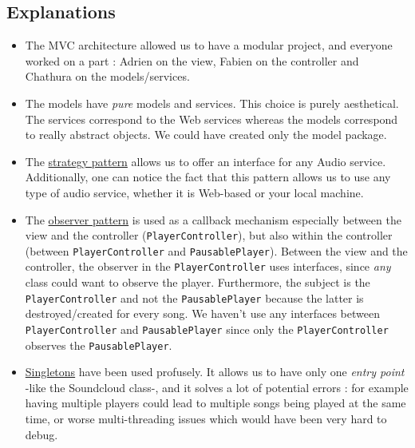 \documentclass{report}
\begin{document}
{\subsection{Explanations}

\begin{itemize}
\item The MVC architecture allowed us to have a modular project, and everyone worked on a part : Adrien on the view, Fabien on the controller and Chathura on the models/services. 
\item The models have \textit{pure} models and services. This choice is purely aesthetical. The services correspond to the Web services whereas the models correspond to really abstract objects. We could have created only the model package.
\item The \href{https://en.wikipedia.org/wiki/Strategy_pattern}{strategy pattern} allows us to offer an interface for any Audio service. Additionally, one can notice the fact that this pattern allows us to use any type of audio service, whether it is Web-based or your local machine.
\item The \href{https://en.wikipedia.org/wiki/Observer_pattern}{observer pattern} is used as a callback mechanism especially between the view and the controller (\texttt{PlayerController}), but also within the controller (between \texttt{PlayerController} and \texttt{PausablePlayer}). Between the view and the controller, the observer in the \texttt{PlayerController} uses interfaces, since \textit{any} class could want to observe the player. Furthermore, the subject is the \texttt{PlayerController} and not the \texttt{PausablePlayer} because the latter is destroyed/created for every song. We haven't use any interfaces between \texttt{PlayerController} and \texttt{PausablePlayer} since only the \texttt{PlayerController} observes the \texttt{PausablePlayer}.
\item \href{http://weknowmemes.com/generator/uploads/generated/g1406353714448670979.jpg}{Singletons} have been used profusely. It allows us to have only one \textit{entry point} -like the Soundcloud class-, and it solves a lot of potential errors : for example having multiple players could lead to multiple songs being played at the same time, or worse multi-threading issues which would have been very hard to debug. 
\end{itemize}
}
\end{document}
